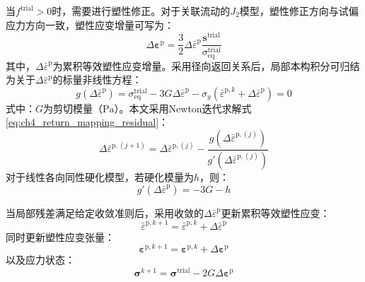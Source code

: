当$f^{\mathrm{trial}}>0$时，需要进行塑性修正。对于关联流动的$J_2$模型，塑性修正方向与试偏应力方向一致，塑性应变增量可写为：
\begin{equation}
	\Delta\boldsymbol{\varepsilon}^{\mathrm{p}}
	=
	\frac{3}{2}
	\Delta\bar{\varepsilon}^{\mathrm{p}}
	\frac{\boldsymbol{s}^{\mathrm{trial}}}
	{\sigma_{\mathrm{eq}}^{\mathrm{trial}}}
	\label{eq:ch4_plastic_strain_increment}
\end{equation}
其中，$\Delta\bar{\varepsilon}^{\mathrm{p}}$为累积等效塑性应变增量。采用径向返回关系后，局部本构积分可归结为关于$\Delta\bar{\varepsilon}^{\mathrm{p}}$的标量非线性方程：
\begin{equation}
	g\left(\Delta\bar{\varepsilon}^{\mathrm{p}}\right)
	=
	\sigma_{\mathrm{eq}}^{\mathrm{trial}}
	-
	3G\Delta\bar{\varepsilon}^{\mathrm{p}}
	-
	\sigma_y
	\left(
	\bar{\varepsilon}^{\mathrm p,k}
	+\Delta\bar{\varepsilon}^{\mathrm{p}}
	\right)
	=0
	\label{eq:ch4_return_mapping_residual}
\end{equation}
\noindent 式中：$G$为剪切模量（$\mathrm{Pa}$）。本文采用Newton迭代求解式\eqref{eq:ch4_return_mapping_residual}：
\begin{equation}
	\Delta\bar{\varepsilon}^{\mathrm p,(j+1)}
	=
	\Delta\bar{\varepsilon}^{\mathrm p,(j)}
	-
	\frac{
		g\!\left(
		\Delta\bar{\varepsilon}^{\mathrm p,(j)}
		\right)
	}{
		g'\!\left(
		\Delta\bar{\varepsilon}^{\mathrm p,(j)}
		\right)
	}
	\label{eq:ch4_return_newton}
\end{equation}
对于线性各向同性硬化模型，若硬化模量为$h$，则：
\begin{equation}
	g'\left(\Delta\bar{\varepsilon}^{\mathrm{p}}\right)
	=
	-3G-h
	\label{eq:ch4_return_derivative}
\end{equation}

当局部残差满足给定收敛准则后，采用收敛的$\Delta\bar{\varepsilon}^{\mathrm{p}}$更新累积等效塑性应变：
\begin{equation}
	\bar{\varepsilon}^{\mathrm p,k+1}
	=
	\bar{\varepsilon}^{\mathrm p,k}
	+
	\Delta\bar{\varepsilon}^{\mathrm{p}}
	\label{eq:ch4_equivalent_plastic_strain_update}
\end{equation}
同时更新塑性应变张量：
\begin{equation}
	\boldsymbol{\varepsilon}^{\mathrm p,k+1}
	=
	\boldsymbol{\varepsilon}^{\mathrm p,k}
	+
	\Delta\boldsymbol{\varepsilon}^{\mathrm{p}}
	\label{eq:ch4_plastic_strain_update}
\end{equation}
以及应力状态：
\begin{equation}
	\boldsymbol{\sigma}^{k+1}
	=
	\boldsymbol{\sigma}^{\mathrm{trial}}
	-
	2G\Delta\boldsymbol{\varepsilon}^{\mathrm{p}}
	\label{eq:ch4_stress_update}
\end{equation}

